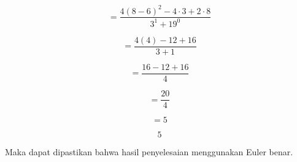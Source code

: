 \documentclass[a4paper,10pt]{article}
\begin{document}
\begin{eulernotebook}
\begin{eulercomment}
\begin{eulercomment}
\begin{eulercomment}
\begin{eulercomment}
\begin{eulercomment}
\begin{eulercomment}
\begin{eulercomment}
\begin{eulercomment}
\begin{eulercomment}
\begin{eulercomment}
\begin{eulercomment}
\begin{eulercomment}
\begin{eulercomment}
\end{eulercomment}
\begin{eulercomment}
\end{eulercomment}
\begin{eulerformula}
\[
= \frac {4(8 - 6)^2 - 4 \cdot 3 + 2 \cdot 8} {3^1 + 19^0}
\]
\end{eulerformula}
\begin{eulercomment}
\end{eulercomment}
\begin{eulerformula}
\[
= \frac {4(4) - 12 + 16} {3 + 1}
\]
\end{eulerformula}
\begin{eulercomment}
\end{eulercomment}
\begin{eulerformula}
\[
= \frac {16 - 12 + 16} {4}
\]
\end{eulerformula}
\begin{eulercomment}
\end{eulercomment}
\begin{eulerformula}
\[
= \frac {20} {4}
\]
\end{eulerformula}
\begin{eulercomment}
\end{eulercomment}
\begin{eulerformula}
\[
= 5
\]
\end{eulerformula}
\begin{eulerformula}
\[
5
\]
\end{eulerformula}
\begin{eulercomment}
Maka dapat dipastikan bahwa hasil penyelesaian menggunakan Euler
benar.
\end{eulercomment}
\begin{eulercomment}



\end{eulercomment}
\end{eulercomment}
\end{eulercomment}
\end{eulercomment}
\end{eulercomment}
\end{eulercomment}
\end{eulercomment}
\end{eulercomment}
\end{eulercomment}
\end{eulercomment}
\end{eulercomment}
\end{eulercomment}
\end{eulercomment}
\end{eulernotebook}
\end{document}
